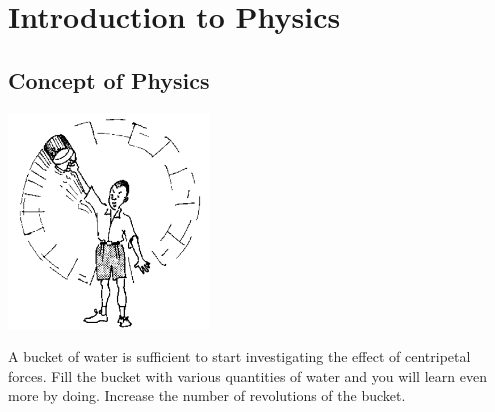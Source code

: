 \section{Introduction to Physics}

\begin{multicols}{2}


\section*{Concept of Physics}



\begin{center}
\includegraphics[width=0.4\textwidth]{./img/source/bucket-swing.png}
\end{center}


A bucket of water is sufficient to start investigating the effect of centripetal forces. Fill the
bucket with various quantities of water and you will learn even more by doing. Increase the
number of revolutions of the bucket.\\


\end{multicols}
